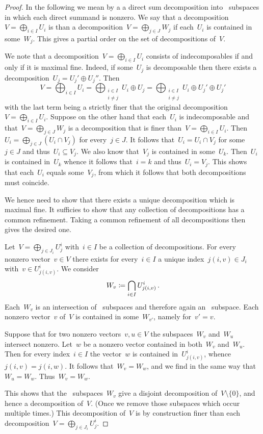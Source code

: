\documentclass[a4paper, 11pt, twoside=semi]{scrartcl}
\begin{document}
\begin{proof}
  In the following we mean by a  a direct sum decomposition into~ subspaces in which each direct summand is nonzero.
  We say that a decomposition~$V = \bigoplus_{i \in I} U_i$ is  than a decomposition~$V = \bigoplus_{j \in J} W_j$ if each~$U_i$ is contained in some~$W_j$.
  This gives a partial order on the set of decompositions of~$V$.

  We note that a decomposition~$V = \bigoplus_{i \in I} U_i$ consists of indecomposables if and only if it is maximal fine.
  Indeed, if some~$U_j$ is decomposable then there exists a decomposition~$U_j = U_j' \oplus U_j''$.
  Then
  \[
    V
    =
    \bigoplus_{i \in I} U_i
    =
    \bigoplus_{\substack{i \in I \\ i \neq j}} U_i \oplus U_j
    =
    \bigoplus_{\substack{i \in I \\ i \neq j}} U_i \oplus U_j' \oplus U_j'
  \]
  with the last term being a strictly finer that the original decomposition~$V = \bigoplus_{i \in I} U_i$.
  Suppose on the other hand that each~$U_i$ is indecomposable and that~$V = \bigoplus_{j \in J} W_j$ is a decomposition that is finer than~$V = \bigoplus_{i \in I} U_i$.
  Then~$U_i = \bigoplus_{j \in J} (U_i \cap V_j)$ for every~$j \in J$.
  It follows that~$U_i = U_i \cap V_j$ for some~$j \in J$ and thus~$U_i \subseteq V_j$.
  We also know that~$V_j$ is contained in some~$U_k$.
  Then~$U_i$ is contained in~$U_k$ whence it follows that~$i = k$ and thus~$U_i = V_j$.
  This shows that each~$U_i$ equals some~$V_j$, from which it follows that both decompositions must coincide.

  We hence need to show that there exists a unique decomposition which is maximal fine.
  It sufficies to show that any collection of decompositions has a common refinement.
  Taking a common refinement of all decompositions then gives the desired one.

  Let~$V = \bigoplus_{j \in J_i} U^i_j$ with~$i \in I$ be a collection of decompositions.
  For every nonzero vector~$v \in V$ there exists for every~$i \in I$ a unique index~$j(i,v) \in J_i$ with~$v \in U^i_{j(i,v)}$.
  We consider
  \[
    W_v
    \coloneqq
    \bigcap_{i \in I} U^i_{j(i,v)} \,.
  \]
  Each~$W_v$ is an intersection of~ subspaces and therefore again an~ subspace.
  Each nonzero vector~$v$ of~$V$ is contained in some~$W_{v'}$, namely for~$v' = v$.

  Suppose that for two nonzero vectors~$v, u \in V$ the subspaces~$W_v$ and~$W_u$ intersect nonzero.
  Let~$w$ be a nonzero vector contained in both~$W_v$ and~$W_u$.
  Then for every index~$i \in I$ the vector~$w$ is contained in~$U^i_{j(i,v)}$, whence~$j(i,v) = j(i,w)$.
  It follows that~$W_v = W_w$, and we find in the same way that~$W_u = W_w$.
  Thus~$W_v = W_w$.

  This shows that the~ subspaces~$W_v$ give a disjoint decomposition of~$V \setminus \{0\}$, and hence a decomposition of~$V$.
  (Once we remove those subspaces which occur multiple times.)
  This decomposition of~$V$ is by construction finer than each decomposition~$V = \bigoplus_{j \in J_i} U^i_j$.
\end{proof}
\end{document}

